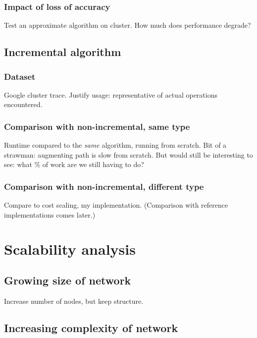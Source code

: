 \subsubsection{Impact of loss of accuracy}

Test an approximate algorithm on cluster. How much does performance degrade?

\subsection{Incremental algorithm}

\subsubsection{Dataset}

Google cluster trace. Justify usage: representative of actual operations encountered.

\subsubsection{Comparison with non-incremental, same type}

Runtime compared to the {\it same} algorithm, running from scratch. Bit of a strawman: augmenting path is slow from scratch. But would still be interesting to see: what \% of work are we still having to do?

\subsubsection{Comparison with non-incremental, different type}

Compare to cost scaling, my implementation. (Comparison with reference implementations comes later.)

\section{Scalability analysis}

\subsection{Growing size of network}

Increase number of nodes, but keep structure.

\subsection{Increasing complexity of network}

